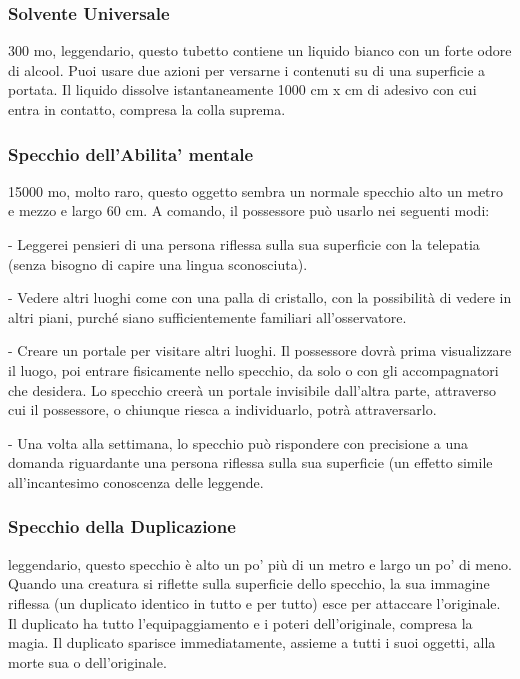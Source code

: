 \begin{multicols}{2}
\medskip

\subsubsection*{Solvente Universale}
300 mo, leggendario, questo tubetto contiene un liquido bianco con un forte odore di alcool. Puoi usare due azioni per versarne i contenuti su di una superficie a portata. Il liquido dissolve istantaneamente 1000 cm x cm di adesivo con cui entra in contatto, compresa la colla suprema.

\subsubsection*{Specchio dell’Abilita' mentale}
15000 mo, molto raro, questo oggetto sembra un normale specchio alto un metro e mezzo e largo 60 cm. A comando, il possessore può usarlo nei seguenti modi:

- Leggerei pensieri di una persona riflessa sulla sua superficie con la telepatia (senza bisogno di capire una lingua sconosciuta).

- Vedere altri luoghi come con una palla di cristallo, con la possibilità di vedere in altri piani, purché siano sufficientemente familiari all’osservatore.

- Creare un portale per visitare altri luoghi. Il possessore dovrà prima visualizzare il luogo, poi entrare fisicamente nello specchio, da solo o con gli accompagnatori che desidera. Lo specchio creerà un portale invisibile dall’altra parte, attraverso cui il possessore, o chiunque riesca a individuarlo, potrà attraversarlo.

- Una volta alla settimana, lo specchio può rispondere con precisione a una domanda riguardante una persona riflessa sulla sua superficie (un effetto simile all’incantesimo conoscenza delle leggende.

\subsubsection*{Specchio della Duplicazione}
leggendario, questo specchio è alto un po’ più di un metro e largo un po’ di meno. Quando una creatura si riflette sulla superficie dello specchio, la sua immagine riflessa (un duplicato identico in tutto e per tutto) esce per attaccare l'originale. Il duplicato ha tutto l’equipaggiamento e i poteri dell'originale, compresa la magia. Il duplicato sparisce immediatamente, assieme a tutti i suoi oggetti, alla morte sua o dell'originale.


\end{multicols}

